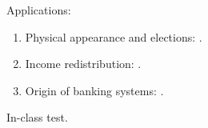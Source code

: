\documentclass[letterpaper]{article}
\renewenvironment{itemize}{
  \begin{list}{}{
    \setlength{\leftmargin}{1.5em}
  }
}{
  \end{list}
}
\begin{document}
\begin{enumerate}
\begin{itemize}
\begin{enumerate}
          \end{enumerate}

       \item[$\diamond$] Applications:

           \begin{enumerate}


           \item[$\bullet$] Physical appearance and elections: \href{https://doi.org/10.1111/pops.12940}{}.


           \item[$\bullet$] Income redistribution: \href{https://doi.org/10.1111/j.1467-9221.2006.00509.x}{}.


          \item[$\bullet$] Origin of banking systems: \href{https://search.ebscohost.com/login.aspx?direct=true&db=nlebk&AN=516924&site=ehost-live&scope=site&ebv=EB&ppid=pp_88}{}.


         \end{enumerate}

             \item[{\color{red}$\diamond$}] {\color{red}In-class test}.

       
      \end{itemize}


\end{enumerate}
\end{document}
